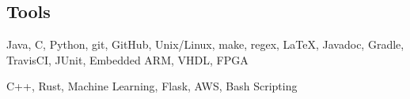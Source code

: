 \documentclass[18pt]{article}
\providecommand{\tightlist}{
    \setlength{\itemsep}{0pt}\setlength{\parskip}{0pt}
}
\begin{document}
    \subsection*{Tools}\label{languages}
    \begin{description}\tightlist
        \item[Proficient:] Java,
        C,
        Python,
        git,
        GitHub,
        Unix/Linux,
        make,
        regex,
        \LaTeX,
        Javadoc,
        Gradle,
        TravisCI,
        JUnit,
        Embedded ARM,
        VHDL,
        FPGA
        \item[Learning:] C++,
        Rust,
        Machine Learning,
        Flask,
        AWS,
        Bash Scripting
    \end{description}
\end{document}
